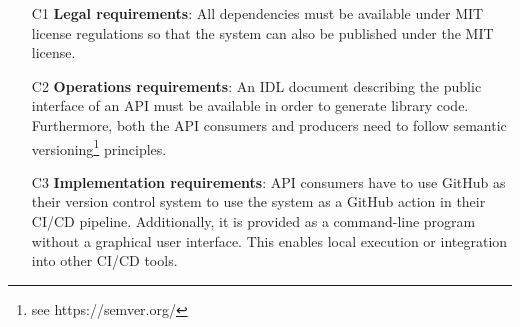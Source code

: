 \begin{itemize}[itemindent=-13pt, leftmargin=43pt, align=left]
    \item [C1\hphantom{1}]  \textbf{Legal requirements}: All dependencies must be available under MIT license regulations so that the system can also be published under the MIT license.
    \item [C2\hphantom{1}]  \textbf{Operations requirements}: An IDL document describing the public interface of an API must be available in order to generate library code. Furthermore, both the API consumers and producers need to follow semantic versioning\footnote{see https://semver.org/} principles.
    \item [C3\hphantom{1}]  \textbf{Implementation requirements}: API consumers have to use GitHub as their version control system to use the system as a GitHub action in their CI/CD pipeline. Additionally, it is provided as a command-line program without a graphical user interface. This enables local execution or integration into other CI/CD tools.
\end{itemize}
